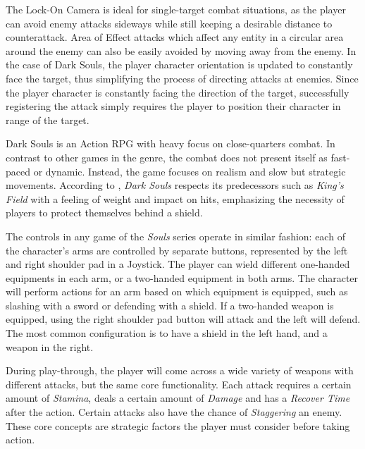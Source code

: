 \documentclass[cic,tc,english]{iiufrgs}
\begin{document}
The Lock-On Camera is ideal for single-target combat situations, as the player can avoid enemy attacks sideways while still keeping a desirable distance to counterattack. Area of Effect attacks which affect any entity in a circular area around the enemy can also be easily avoided by moving away from the enemy. In the case of Dark Souls, the player character orientation is updated to constantly face the target, thus simplifying the process of directing attacks at enemies. Since the player character is constantly facing the direction of the target, successfully registering the attack simply requires the player to position their character in range of the target.

Dark Souls is an Action RPG with heavy focus on close-quarters combat. In contrast to other games in the genre, the combat does not present itself as fast-paced or dynamic. Instead, the game focuses on realism and slow but strategic movements. According to \cite{BOOK_DarkSoulsBeyondTheGrave}, \emph{Dark Souls} respects its predecessors such as \emph{King's Field} with a feeling of weight and impact on hits, emphasizing the necessity of players to protect themselves behind a shield.

The controls in any game of the \emph{Souls} series operate in similar fashion: each of the character's arms are controlled by separate buttons, represented by the left and right shoulder pad in a Joystick. The player can wield different one-handed equipments in each arm, or a two-handed equipment in both arms. The character will perform actions for an arm based on which equipment is equipped, such as slashing with a sword or defending with a shield. If a two-handed weapon is equipped, using the right shoulder pad button will attack and the left will defend. The most common configuration is to have a shield in the left hand, and a weapon in the right.

During play-through, the player will come across a wide variety of weapons with different attacks, but the same core functionality. Each attack requires a certain amount of \emph{Stamina}, deals a certain amount of \emph{Damage} and has a \emph{Recover Time} after the action. Certain attacks also have the chance of \emph{Staggering} an enemy. These core concepts are strategic factors the player must consider before taking action. 
\end{document}
